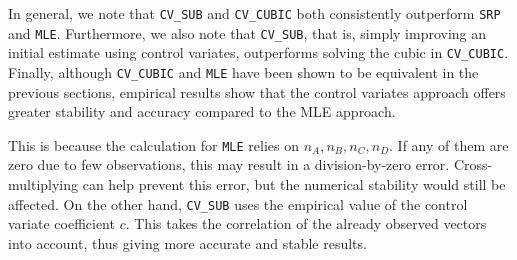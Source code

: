 \documentclass[runningheads]{llncs}
\begin{document}
    In general, we note that \verb|CV_SUB| and \verb|CV_CUBIC| both consistently outperform \verb|SRP| and \verb|MLE|. Furthermore, we also note that \verb|CV_SUB|, that is, simply improving an initial estimate using control variates, outperforms solving the cubic in \verb|CV_CUBIC|. Finally, although \verb|CV_CUBIC| and \verb|MLE| have been shown to be equivalent in the previous sections, empirical results show that the control variates approach offers greater stability and accuracy compared to the MLE approach.

    This is because the calculation for \verb|MLE| relies on $n_A, n_B, n_C, n_D$. If any of them are zero due to few observations, this may result in a division-by-zero error. Cross-multiplying can help prevent this error, but the numerical stability would still be affected. On the other hand, \verb|CV_SUB| uses the empirical value of the control variate coefficient $c$. This takes the correlation of the already observed vectors into account, thus giving more accurate and stable results.
    
\end{document}
